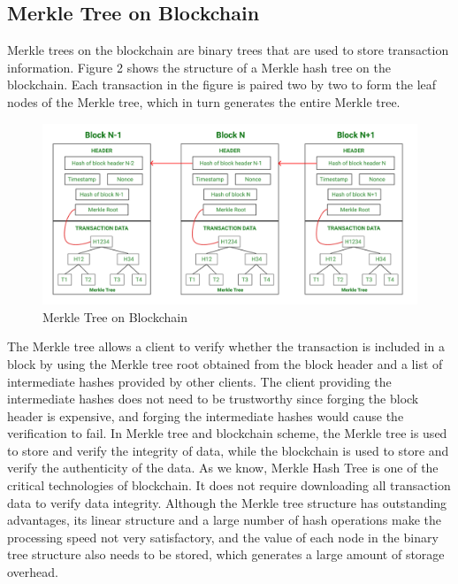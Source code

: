 \subsection{Merkle Tree on Blockchain}
Merkle trees on the blockchain are binary trees that are used to store transaction information. Figure 2 shows the structure of a Merkle hash tree on the blockchain. Each transaction in the figure is paired two by two to form the leaf nodes of the Merkle tree, which in turn generates the entire Merkle tree. 
\begin{figure}[H]
    \centering
    \includegraphics[scale=0.6]{figures/Blockchain and Merkle Tree.png}
    \caption{Merkle Tree on Blockchain}
 
\end{figure}
The Merkle tree allows a client to verify whether the transaction is included in a block by using the Merkle tree root obtained from the block header and a list of intermediate hashes provided by other clients. The client providing the intermediate hashes does not need to be trustworthy since forging the block header is expensive, and forging the intermediate hashes would cause the verification to fail.
In Merkle tree and blockchain scheme, the Merkle tree is used to store and verify the integrity of data, while the blockchain is used to store and verify the authenticity of the data.
As we know, Merkle Hash Tree is one of the critical technologies of blockchain. It does not require downloading all transaction data to verify data integrity. Although the Merkle tree structure has outstanding advantages, its linear structure and a large number of hash operations make the processing speed not very satisfactory, and the value of each node in the binary tree structure also needs to be stored, which generates a large amount of storage overhead.
